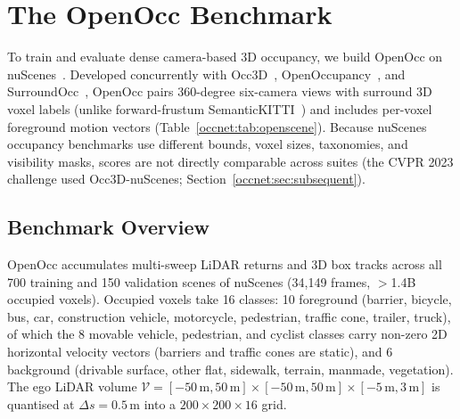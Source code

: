 \section{The OpenOcc Benchmark}\label{occnet:sec:benchmark}

To train and evaluate dense camera-based 3D occupancy, we build OpenOcc on nuScenes~\cite{caesar2020nuscenes,fong2022panoptic}. Developed concurrently with Occ3D~\cite{tian2023occ3d}, OpenOccupancy~\cite{wang2023openoccupancy}, and SurroundOcc~\cite{wei2023surroundocc}, OpenOcc pairs 360-degree six-camera views with surround 3D voxel labels (unlike forward-frustum SemanticKITTI~\cite{behley2019semantickitti}) and includes per-voxel foreground motion vectors (Table~\ref{occnet:tab:openscene}). Because nuScenes occupancy benchmarks use different bounds, voxel sizes, taxonomies, and visibility masks, scores are not directly comparable across suites (\eg the CVPR 2023 challenge used Occ3D-nuScenes; Section~\ref{occnet:sec:subsequent}).

\subsection{Benchmark Overview}\label{occnet:sec:benchmark_overview}

OpenOcc accumulates multi-sweep LiDAR returns and 3D box tracks across all 700 training and 150 validation scenes of nuScenes (34,149 frames, $>$1.4B occupied voxels). Occupied voxels take 16 classes: 10 foreground (barrier, bicycle, bus, car, construction vehicle, motorcycle, pedestrian, traffic cone, trailer, truck), of which the 8 movable vehicle, pedestrian, and cyclist classes carry non-zero 2D horizontal velocity vectors (barriers and traffic cones are static), and 6 background (drivable surface, other flat, sidewalk, terrain, manmade, vegetation). The ego LiDAR volume $\mathcal{V}=[-50\,\text{m},50\,\text{m}]\times[-50\,\text{m},50\,\text{m}]\times[-5\,\text{m},3\,\text{m}]$ is quantised at $\Delta s=0.5$\,m into a $200\times200\times16$ grid.

